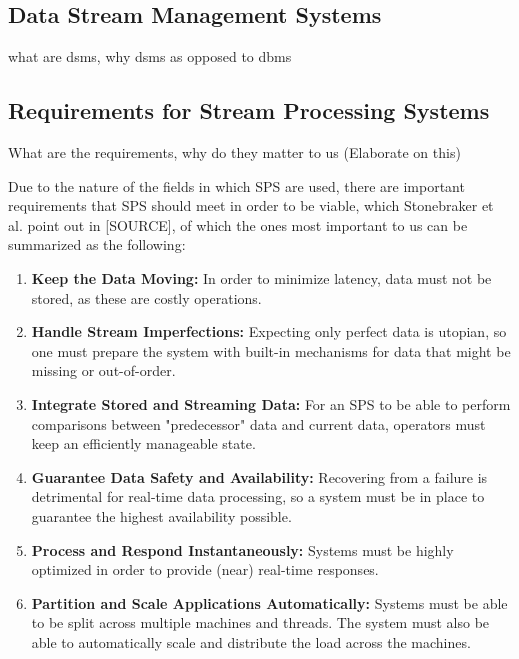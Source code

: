         \subsection{Data Stream Management Systems}
        what are dsms, why dsms as opposed to dbms

        \subsection{Requirements for Stream Processing Systems}
        What are the requirements, why do they matter to us (Elaborate on this)

        Due to the nature of the fields in which SPS are used, there are important requirements that SPS should meet in order to be viable, 
        which Stonebraker et al. point out in [SOURCE], of which the ones most important to us can be summarized as the following:
        
        \begin{enumerate}
            \item \textbf{Keep the Data Moving:} 
                In order to minimize latency, data must not be stored, as these are costly operations.
            \item \textbf{Handle Stream Imperfections:} 
                Expecting only perfect data is utopian, so one must prepare the system with built-in mechanisms for data that might be missing or out-of-order.
            \item \textbf{Integrate Stored and Streaming Data:} 
                For an SPS to be able to perform comparisons between "predecessor" data and current data, operators must keep an efficiently manageable state.
            \item \textbf{Guarantee Data Safety and Availability:} 
                Recovering from a failure is detrimental for real-time data processing, so a system must be in place to guarantee the highest availability possible.
            \item \textbf{Process and Respond Instantaneously:} 
                Systems must be highly optimized in order to provide (near) real-time responses.
            \item \textbf{Partition and Scale Applications Automatically:} 
                Systems must be able to be split across multiple machines and threads.
                The system must also be able to automatically scale and distribute the load across the machines.

        \end{enumerate}

